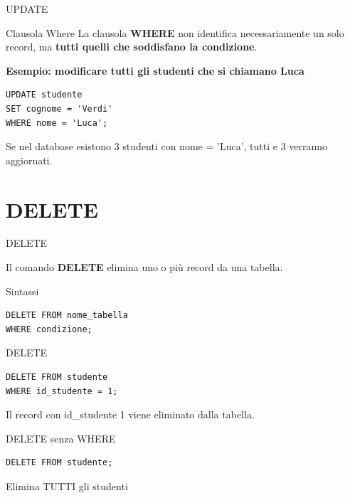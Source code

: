 \documentclass{beamer}
\begin{document}
\begin{frame}[fragile]{UPDATE}
\small

\begin{block}{Clausola Where}
La clausola \textbf{WHERE} non identifica necessariamente
un solo record, ma \textbf{tutti quelli che soddisfano la condizione}.
\end{block}

\medskip
\textbf{Esempio: modificare tutti gli studenti che si chiamano Luca}

\begin{verbatim}
UPDATE studente
SET cognome = 'Verdi'
WHERE nome = 'Luca';
\end{verbatim}

\medskip
Se nel database esistono 3 studenti con nome = 'Luca',
tutti e 3 verranno aggiornati.

\end{frame}

\section{DELETE}
\begin{frame}[fragile]{DELETE}

Il comando \textbf{DELETE} elimina uno o più record da una tabella.
\begin{block}{Sintassi}
\begin{verbatim}
DELETE FROM nome_tabella
WHERE condizione;
\end{verbatim}
\end{block}
\end{frame}

\begin{frame}[fragile]{DELETE}
\small
\begin{verbatim}
DELETE FROM studente
WHERE id_studente = 1;
\end{verbatim}

\medskip
Il record con id\_studente 1 viene eliminato dalla tabella.
\end{frame}

\begin{frame}[fragile]{DELETE senza WHERE}
\small
\begin{verbatim}
DELETE FROM studente;
\end{verbatim}

\medskip
\alert{Elimina TUTTI gli studenti}

\end{frame}
\end{document}
